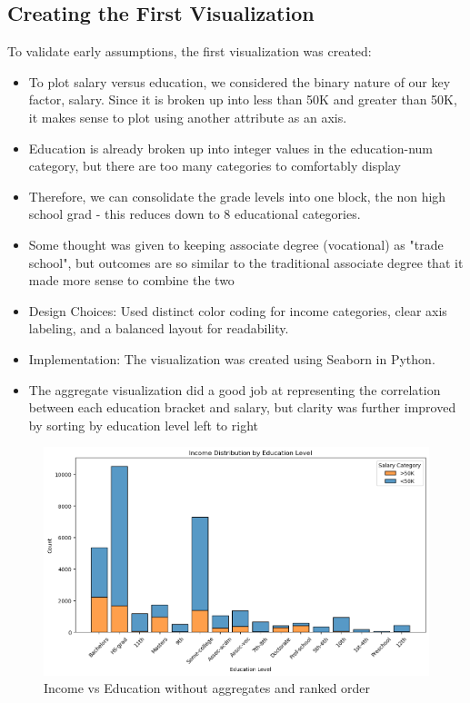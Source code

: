 \documentclass[journal]{IEEEtran}
\begin{document}
\subsection{Creating the First Visualization}
To validate early assumptions, the first visualization was created:
\begin{itemize}
    \item To plot salary versus education, we considered the binary nature of our key factor, salary. Since it is broken up into less than 50K and greater than 50K, it makes sense to plot using another attribute as an axis.
    \item Education is already broken up into integer values in the education-num category, but there are too many categories to comfortably display
    \item Therefore, we can consolidate the grade levels into one block, the non high school grad - this reduces down to 8 educational categories.
    \item Some thought was given to keeping associate degree (vocational) as "trade school", but outcomes are so similar to the traditional associate degree that it made more sense to combine the two
    \item Design Choices: Used distinct color coding for income categories, clear axis labeling, and a balanced layout for readability.
    \item Implementation: The visualization was created using Seaborn in Python.
    \item The aggregate visualization did a good job at representing the correlation between each education bracket and salary, but clarity was further improved by sorting by education level left to right
\end{itemize}

\begin{figure}[h]
    \centering
    \includegraphics[width=\columnwidth]{hist_bad.png}  %
    \caption{Income vs Education without aggregates and ranked order}
    \label{fig:Income vs Education without aggregates and order}
\end{figure}
\end{document}
